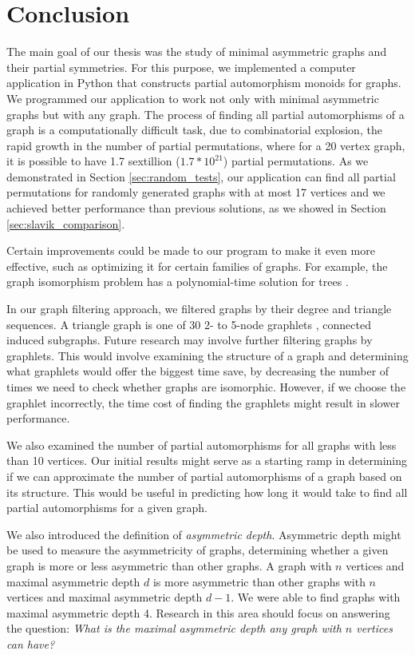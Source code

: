 \chapter*{Conclusion}\label{chap:conclusion}

The main goal of our thesis was the study of minimal asymmetric graphs and their partial symmetries. For this purpose, we implemented a computer application in Python that constructs partial automorphism monoids for graphs. We programmed our application to work not only with minimal asymmetric graphs but with any graph. The process of finding all partial automorphisms of a graph is a computationally difficult task, due to combinatorial explosion, the rapid growth in the number of partial permutations, where for a 20 vertex graph, it is possible to have 1.7 sextillion ($1.7*10^{21}$) partial permutations. As we demonstrated in Section \ref{sec:random_tests}, our application can find all partial permutations for randomly generated graphs with at most 17 vertices and we achieved better performance than previous solutions, as we showed in Section \ref{sec:slavik_comparison}.

Certain improvements could be made to our program to make it even more effective, such as optimizing it for certain families of graphs. For example, the graph isomorphism problem has a polynomial-time solution for trees \cite{tree_polyn}.

In our graph filtering approach, we filtered graphs by their degree and triangle sequences. A triangle graph is one of 30 2- to 5-node graphlets \cite{graphlets}, connected induced subgraphs. Future research may involve further filtering graphs by graphlets. This would involve examining the structure of a graph and determining what graphlets would offer the biggest time save, by decreasing the number of times we need to check whether graphs are isomorphic. However, if we choose the graphlet incorrectly, the time cost of finding the graphlets might result in slower performance.

We also examined the number of partial automorphisms for all graphs with less than 10 vertices. Our initial results might serve as a starting ramp in determining if we can approximate the number of partial automorphisms of a graph based on its structure. This would be useful in predicting how long it would take to find all partial automorphisms for a given graph.

We also introduced the definition of \emph{asymmetric depth}. Asymmetric depth might be used to measure the asymmetricity of graphs, determining whether a given graph is more or less asymmetric than other graphs. A graph with $n$ vertices and maximal asymmetric depth $d$ is more asymmetric than other graphs with $n$ vertices and maximal asymmetric depth $d - 1$. We were able to find graphs with maximal asymmetric depth 4. Research in this area should focus on answering the question: \emph{What is the maximal asymmetric depth any graph with $n$ vertices can have?}